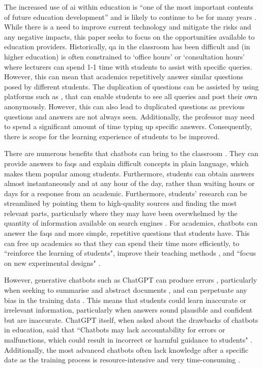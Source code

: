 The increased use of \acrshort{ai} within education is ``one of the most important contents of future education development” \citep{BrowMcCoReev2020eu} and is likely to continue to be for many years \citep{zawacki2019systematic}. While there is a need to improve current technology and mitigate the risks and any negative impacts, this paper seeks to focus on the opportunities available to education providers. Historically, \acrshort{qa} in the classroom has been difficult and (in higher education) is often constrained to `office hours' or `consultation hours' where lecturers can spend 1-1 time with students to assist with specific queries. However, this can mean that academics repetitively answer similar questions posed by different students. The duplication of questions can be assisted by using platforms such as \citet{Piazza}, that can enable students to see all queries and post their own anonymously. However, this can also lead to duplicated questions as previous questions and answers are not always seen. Additionally, the professor may need to spend a significant amount of time typing up specific answers. Consequently, there is scope for the learning experience of students to be improved.

There are numerous benefits that chatbots can bring to the classroom \citep{Stanislav}. They can provide answers to \acrshort{faq}s and explain difficult concepts in plain language, which makes them popular among students. Furthermore, students can obtain answers almost instantaneously and at any hour of the day, rather than waiting hours or days for a response from an academic. Furthermore, students' research can be streamlined by pointing them to high-quality sources and finding the most relevant parts, particularly where they may have been overwhelmed by the quantity of information available on search engines \citep{Chen22}. For academics, chatbots can answer the \acrshort{faq}s and more simple, repetitive questions that students have. This can free up academics so that they can spend their time more efficiently, to ``reinforce the learning of students", improve their teaching methods \citep{Prez2020}, and ``focus on new experimental designs" \citep{Eva}.

However, generative chatbots such as ChatGPT can produce errors \citep{marcus2018, Bender21, Eva}, particularly when seeking to summarise and abstract documents \citep{Durmus_2020}, and can perpetuate any bias in the training data \citep{geva2019, brown2020}. This means that students could learn inaccurate or irrelevant information, particularly when answers sound plausible and confident but are inaccurate. ChatGPT itself, when asked about the drawbacks of chatbots in education, said that ``Chatbots may lack accountability for errors or malfunctions, which could result in incorrect or harmful guidance to students" \citep{chatgpt23}. Additionally, the most advanced chatbots often lack knowledge after a specific date as the training process is resource-intensive and very time-consuming \citep{Jungherr}.

